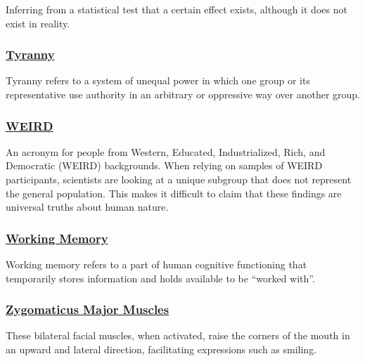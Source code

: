 \documentclass[
  letterpaper,
]{book}
\begin{document}
Inferring from a statistical test that a certain effect exists, although
it does not exist in reality.

\subsubsection*{\texorpdfstring{\hyperref[def-tyranny]{Tyranny}}{Tyranny}}\label{tyranny}

Tyranny refers to a system of unequal power in which one group or its
representative use authority in an arbitrary or oppressive way over
another group.

\subsubsection*{\texorpdfstring{\hyperref[def-WEIRD]{WEIRD}}{WEIRD}}\label{weird}

An acronym for people from Western, Educated, Industrialized, Rich, and
Democratic (WEIRD) backgrounds. When relying on samples of WEIRD
participants, scientists are looking at a unique subgroup that does not
represent the general population. This makes it difficult to claim that
these findings are universal truths about human nature.

\subsubsection*{\texorpdfstring{\hyperref[def-workingmemory]{Working
Memory}}{Working Memory}}\label{working-memory}

Working memory refers to a part of human cognitive functioning that
temporarily stores information and holds available to be ``worked
with''.

\subsubsection*{\texorpdfstring{\hyperref[def-zygomaticusmajormuscles]{Zygomaticus
Major
Muscles}}{Zygomaticus Major Muscles}}\label{zygomaticus-major-muscles}

These bilateral facial muscles, when activated, raise the corners of the
mouth in an upward and lateral direction, facilitating expressions such
as smiling.
\end{document}
